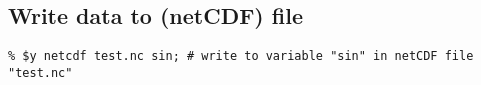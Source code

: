     \subsection{
      \label{write}Write data to (netCDF) file
    }

    \begin{verbatim}
% $y netcdf test.nc sin; # write to variable "sin" in netCDF file "test.nc"
\end{verbatim}

